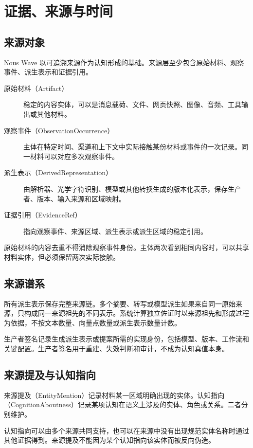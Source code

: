 \chapter{证据、来源与时间}

\section{来源对象}

Nous Wave 以可追溯来源作为认知形成的基础。来源层至少包含原始材料、观察事件、派生表示和证据引用。

\begin{description}
\item[原始材料（Artifact）] 稳定的内容实体，可以是消息载荷、文件、网页快照、图像、音频、工具输出或其他材料。
\item[观察事件（ObservationOccurrence）] 主体在特定时间、渠道和上下文中实际接触某份材料或事件的一次记录。同一材料可以对应多次观察事件。
\item[派生表示（DerivedRepresentation）] 由解析器、光学字符识别、模型或其他转换生成的版本化表示，保存生产者、版本、输入来源和区域映射。
\item[证据引用（EvidenceRef）] 指向观察事件、来源区域、派生表示或派生区域的稳定引用。
\end{description}

原始材料的内容去重不得消除观察事件身份。主体两次看到相同内容时，可以共享材料实体，但必须保留两次实际接触。

\section{来源谱系}

所有派生表示保存完整来源链。多个摘要、转写或模型派生如果来自同一原始来源，只构成同一来源祖先的不同表示。系统计算独立佐证时以来源祖先和形成过程为依据，不按文本数量、向量点数量或派生表示数量计数。

生产者签名记录生成派生表示或提案所需的实现身份，包括模型、版本、工作流和关键配置。生产者签名用于重建、失效判断和审计，不成为认知真值本身。

\section{来源提及与认知指向}

来源提及（EntityMention）记录材料某一区域明确出现的实体。认知指向（CognitionAboutness）记录某项认知在语义上涉及的实体、角色或关系。二者分别维护。

认知指向可以由多个来源共同支持，也可以在来源中没有出现规范实体名称时通过其他证据得到。来源提及不能因为某个认知指向该实体而被反向伪造。

